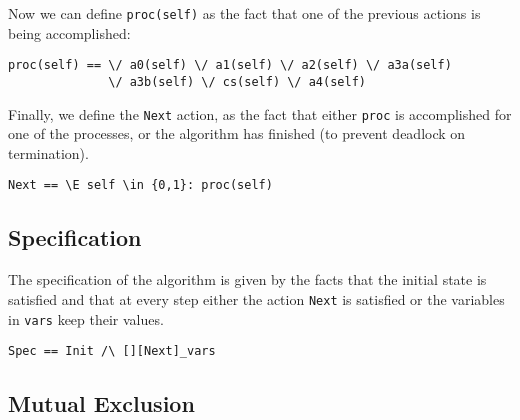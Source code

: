 \documentclass{enonce}
\begin{document}
\noindent Now we can define {\tt proc(self)} as the fact that one of the previous actions is being accomplished:
\begin{verbatim}
proc(self) == \/ a0(self) \/ a1(self) \/ a2(self) \/ a3a(self) 
              \/ a3b(self) \/ cs(self) \/ a4(self)
\end{verbatim}
          
\noindent Finally, we define the {\tt Next} action, as the fact that either {\tt proc} is accomplished for one of the processes, or the algorithm has finished (to prevent deadlock on termination).

\begin{verbatim}         
Next == \E self \in {0,1}: proc(self)
\end{verbatim}

\medskip
\subsection{Specification}
The specification of the algorithm is given by the facts that the initial state is satisfied and that at every step either the action {\tt Next} is satisfied or the variables in {\tt vars} keep their values.

\begin{verbatim}
Spec == Init /\ [][Next]_vars
\end{verbatim}

\medskip
\subsection{Mutual Exclusion}
% 
%
%
%
%
\end{document}
